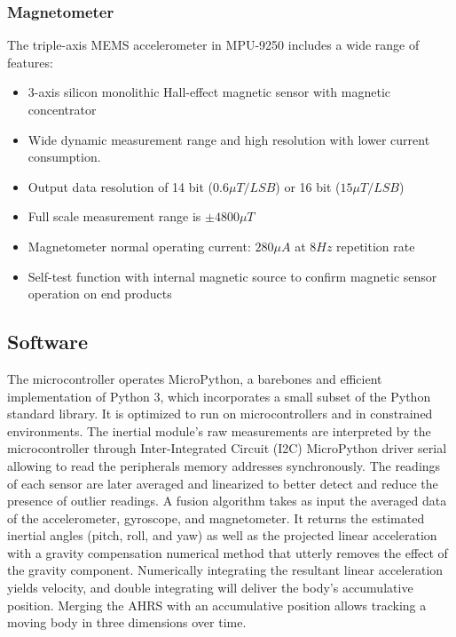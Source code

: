 \subsubsection{Magnetometer}

The triple-axis MEMS accelerometer in MPU-9250 includes a wide range of features:
\begin{itemize}
    \item 3-axis silicon monolithic Hall-effect magnetic sensor with magnetic concentrator
    \item Wide dynamic measurement range and high resolution with lower current consumption.
    \item Output data resolution of 14 bit ($0.6 \mu T/LSB$) or 16 bit ($15 \mu T/LSB$)
    \item Full scale measurement range is $\pm 4800 \mu T$
    \item Magnetometer normal operating current: $280\mu A$ at $8 Hz$ repetition rate
    \item Self-test function with internal magnetic source to confirm magnetic sensor operation on end products
\end{itemize}

\begin{figure}[H]
    \centering
    
\end{figure}

\subsection{Software}
The microcontroller operates MicroPython, a barebones and efficient implementation of Python 3, which incorporates a small subset of the Python standard library. It is optimized to run on microcontrollers and in constrained environments. The inertial module's raw measurements are interpreted by the microcontroller through Inter-Integrated Circuit (I2C) MicroPython driver serial allowing to read the peripherals memory addresses synchronously. The readings of each sensor are later averaged and linearized to better detect and reduce the presence of outlier readings. A fusion algorithm takes as input the averaged data of the accelerometer, gyroscope, and magnetometer. It returns the estimated inertial angles (pitch, roll, and yaw) as well as the projected linear acceleration with a gravity compensation numerical method that utterly removes the effect of the gravity component. Numerically integrating the resultant linear acceleration yields velocity, and double integrating will deliver the body's accumulative position. Merging the AHRS with an accumulative position allows tracking a moving body in three dimensions over time.

